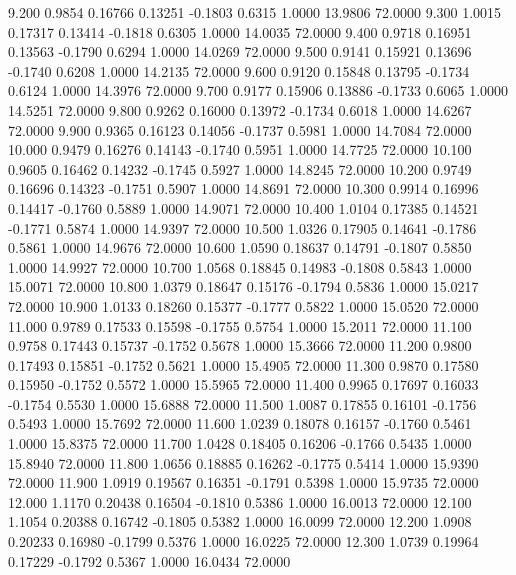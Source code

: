    9.200   0.9854   0.16766   0.13251  -0.1803   0.6315   1.0000  13.9806  72.0000
   9.300   1.0015   0.17317   0.13414  -0.1818   0.6305   1.0000  14.0035  72.0000
   9.400   0.9718   0.16951   0.13563  -0.1790   0.6294   1.0000  14.0269  72.0000
   9.500   0.9141   0.15921   0.13696  -0.1740   0.6208   1.0000  14.2135  72.0000
   9.600   0.9120   0.15848   0.13795  -0.1734   0.6124   1.0000  14.3976  72.0000
   9.700   0.9177   0.15906   0.13886  -0.1733   0.6065   1.0000  14.5251  72.0000
   9.800   0.9262   0.16000   0.13972  -0.1734   0.6018   1.0000  14.6267  72.0000
   9.900   0.9365   0.16123   0.14056  -0.1737   0.5981   1.0000  14.7084  72.0000
  10.000   0.9479   0.16276   0.14143  -0.1740   0.5951   1.0000  14.7725  72.0000
  10.100   0.9605   0.16462   0.14232  -0.1745   0.5927   1.0000  14.8245  72.0000
  10.200   0.9749   0.16696   0.14323  -0.1751   0.5907   1.0000  14.8691  72.0000
  10.300   0.9914   0.16996   0.14417  -0.1760   0.5889   1.0000  14.9071  72.0000
  10.400   1.0104   0.17385   0.14521  -0.1771   0.5874   1.0000  14.9397  72.0000
  10.500   1.0326   0.17905   0.14641  -0.1786   0.5861   1.0000  14.9676  72.0000
  10.600   1.0590   0.18637   0.14791  -0.1807   0.5850   1.0000  14.9927  72.0000
  10.700   1.0568   0.18845   0.14983  -0.1808   0.5843   1.0000  15.0071  72.0000
  10.800   1.0379   0.18647   0.15176  -0.1794   0.5836   1.0000  15.0217  72.0000
  10.900   1.0133   0.18260   0.15377  -0.1777   0.5822   1.0000  15.0520  72.0000
  11.000   0.9789   0.17533   0.15598  -0.1755   0.5754   1.0000  15.2011  72.0000
  11.100   0.9758   0.17443   0.15737  -0.1752   0.5678   1.0000  15.3666  72.0000
  11.200   0.9800   0.17493   0.15851  -0.1752   0.5621   1.0000  15.4905  72.0000
  11.300   0.9870   0.17580   0.15950  -0.1752   0.5572   1.0000  15.5965  72.0000
  11.400   0.9965   0.17697   0.16033  -0.1754   0.5530   1.0000  15.6888  72.0000
  11.500   1.0087   0.17855   0.16101  -0.1756   0.5493   1.0000  15.7692  72.0000
  11.600   1.0239   0.18078   0.16157  -0.1760   0.5461   1.0000  15.8375  72.0000
  11.700   1.0428   0.18405   0.16206  -0.1766   0.5435   1.0000  15.8940  72.0000
  11.800   1.0656   0.18885   0.16262  -0.1775   0.5414   1.0000  15.9390  72.0000
  11.900   1.0919   0.19567   0.16351  -0.1791   0.5398   1.0000  15.9735  72.0000
  12.000   1.1170   0.20438   0.16504  -0.1810   0.5386   1.0000  16.0013  72.0000
  12.100   1.1054   0.20388   0.16742  -0.1805   0.5382   1.0000  16.0099  72.0000
  12.200   1.0908   0.20233   0.16980  -0.1799   0.5376   1.0000  16.0225  72.0000
  12.300   1.0739   0.19964   0.17229  -0.1792   0.5367   1.0000  16.0434  72.0000
